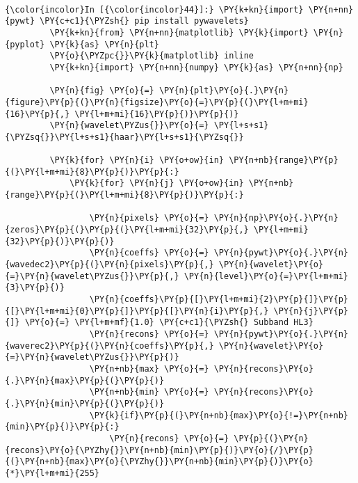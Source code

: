     \begin{center}
    \end{center}
    { \hspace*{\fill} \\}
    
    \begin{Verbatim}[commandchars=\\\{\}]
{\color{incolor}In [{\color{incolor}44}]:} \PY{k+kn}{import} \PY{n+nn}{pywt} \PY{c+c1}{\PYZsh{} pip install pywavelets}
         \PY{k+kn}{from} \PY{n+nn}{matplotlib} \PY{k}{import} \PY{n}{pyplot} \PY{k}{as} \PY{n}{plt}
         \PY{o}{\PYZpc{}}\PY{k}{matplotlib} inline
         \PY{k+kn}{import} \PY{n+nn}{numpy} \PY{k}{as} \PY{n+nn}{np}
         
         \PY{n}{fig} \PY{o}{=} \PY{n}{plt}\PY{o}{.}\PY{n}{figure}\PY{p}{(}\PY{n}{figsize}\PY{o}{=}\PY{p}{(}\PY{l+m+mi}{16}\PY{p}{,} \PY{l+m+mi}{16}\PY{p}{)}\PY{p}{)}
         \PY{n}{wavelet\PYZus{}}\PY{o}{=} \PY{l+s+s1}{\PYZsq{}}\PY{l+s+s1}{haar}\PY{l+s+s1}{\PYZsq{}}
         
         \PY{k}{for} \PY{n}{i} \PY{o+ow}{in} \PY{n+nb}{range}\PY{p}{(}\PY{l+m+mi}{8}\PY{p}{)}\PY{p}{:}
             \PY{k}{for} \PY{n}{j} \PY{o+ow}{in} \PY{n+nb}{range}\PY{p}{(}\PY{l+m+mi}{8}\PY{p}{)}\PY{p}{:}
         
                 \PY{n}{pixels} \PY{o}{=} \PY{n}{np}\PY{o}{.}\PY{n}{zeros}\PY{p}{(}\PY{p}{(}\PY{l+m+mi}{32}\PY{p}{,} \PY{l+m+mi}{32}\PY{p}{)}\PY{p}{)}
                 \PY{n}{coeffs} \PY{o}{=} \PY{n}{pywt}\PY{o}{.}\PY{n}{wavedec2}\PY{p}{(}\PY{n}{pixels}\PY{p}{,} \PY{n}{wavelet}\PY{o}{=}\PY{n}{wavelet\PYZus{}}\PY{p}{,} \PY{n}{level}\PY{o}{=}\PY{l+m+mi}{3}\PY{p}{)}
                 \PY{n}{coeffs}\PY{p}{[}\PY{l+m+mi}{2}\PY{p}{]}\PY{p}{[}\PY{l+m+mi}{0}\PY{p}{]}\PY{p}{[}\PY{n}{i}\PY{p}{,} \PY{n}{j}\PY{p}{]} \PY{o}{=} \PY{l+m+mf}{1.0} \PY{c+c1}{\PYZsh{} Subband HL3}
                 \PY{n}{recons} \PY{o}{=} \PY{n}{pywt}\PY{o}{.}\PY{n}{waverec2}\PY{p}{(}\PY{n}{coeffs}\PY{p}{,} \PY{n}{wavelet}\PY{o}{=}\PY{n}{wavelet\PYZus{}}\PY{p}{)}
                 \PY{n+nb}{max} \PY{o}{=} \PY{n}{recons}\PY{o}{.}\PY{n}{max}\PY{p}{(}\PY{p}{)}
                 \PY{n+nb}{min} \PY{o}{=} \PY{n}{recons}\PY{o}{.}\PY{n}{min}\PY{p}{(}\PY{p}{)}
                 \PY{k}{if}\PY{p}{(}\PY{n+nb}{max}\PY{o}{!=}\PY{n+nb}{min}\PY{p}{)}\PY{p}{:}
                     \PY{n}{recons} \PY{o}{=} \PY{p}{(}\PY{n}{recons}\PY{o}{\PYZhy{}}\PY{n+nb}{min}\PY{p}{)}\PY{o}{/}\PY{p}{(}\PY{n+nb}{max}\PY{o}{\PYZhy{}}\PY{n+nb}{min}\PY{p}{)}\PY{o}{*}\PY{l+m+mi}{255}
                     

\end{Verbatim}
